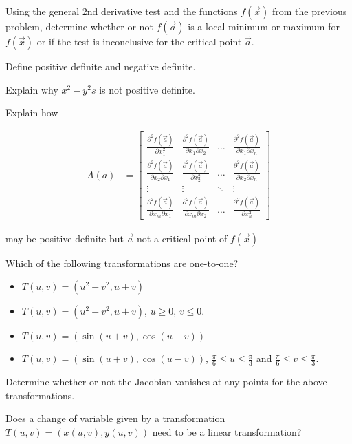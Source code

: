 \documentclass{amsart}
\begin{document}
{
Using the general 2nd derivative test and the functions $f(\vec x)$ from the previous problem, determine whether or not $f(\vec a)$ is a local minimum or maximum for $f(\vec x)$ or if the test is inconclusive for the critical point $\vec a$.
}
{
}

{
Define positive definite and negative definite.
}
{
}

{
Explain why $x^2 - y^2s$ is not positive definite.
}
{
}

{
Explain how 

\begin{align}
	A(a)&=\begin{bmatrix}
				\frac{\partial^2 f(\vec a)}{\partial x_1^2} & \frac{\partial^2 f(\vec a)}{\partial x_1\partial x_2} & \ldots & \frac{\partial^2 f(\vec a)}{\partial x_1 \partial x_n} \\
				\frac{\partial^2 f(\vec a)}{\partial x_2 \partial x_1} & \frac{\partial^2 f(\vec a)}{\partial x_2^2}&  \ldots & \frac{\partial^2 f(\vec a)}{\partial x_2 \partial x_n} \\
				\vdots & \vdots & \ddots & \vdots \\
				\frac{\partial^2 f(\vec a)}{\partial x_m \partial x_1} & \frac{\partial^2 f(\vec a)}{\partial x_m\partial x_2} &\ldots & \frac{\partial^2 f(\vec a)}{\partial x_n^2}			
			\end{bmatrix}
\end{align}

may be positive definite but $\vec a $ not a critical point of $f(\vec x)$
}
{
}

{
Which of the following transformations are one-to-one?

\begin{itemize}
	\item $T(u,v) = (u^2-v^2, u+v)$
	\item $T(u,v) = (u^2 - v^2, u+v)$, $u\geq 0$, $v\leq 0$.
	\item  $T(u,v) = (\sin (u+v), \cos (u-v))$
	\item $T(u,v) = (\sin (u+v), \cos (u-v))$, $\frac{\pi}{6}\leq u\leq \frac{\pi}{3}$ and $\frac{\pi}{6} \leq v\leq  \frac{\pi}{3}$.
\end{itemize}
}
{
}

{
Determine whether or not the Jacobian vanishes at any points for the above transformations.
}
{
}

{
Does a change of variable given by a transformation $T(u,v) = (x(u,v), y(u,v))$ need to be a linear transformation?
}
{
}
\end{document}
